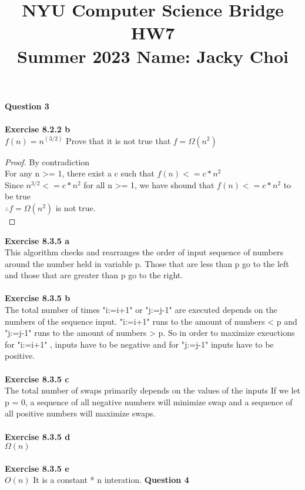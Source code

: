 \documentclass{article}
\title{\textbf{NYU Computer Science Bridge HW7}\\
Summer 2023 Name: Jacky Choi}
\date{}
\begin{document}
\setul{}{2pt}
\maketitle

\noindent \textbf{Question 3}\\\\
\textbf{Exercise 8.2.2 b}\\
$f(n) = n^{(3/2)}$ Prove that it is not true that $f = \Omega(n^2)$\\
\begin{proof}
    By contradiction\\
    For any n >= 1, there exist a c such that $f(n) <= c * n^2$\\
    Since $n^{3/2} <= c * n^2$ for all n >= 1, we have shound that $f(n) <= c * n^2$ to be true\\
    $\therefore f = \Omega(n^2)$ is not true.\\
\end{proof}
\noindent\textbf{Exercise 8.3.5 a}\\
This algorithm checks and rearranges the order of input sequence of numbers around the number held in variable p. Those that are less than p go to the left and those that are greater than p go to the right. \\\\
\textbf{Exercise 8.3.5 b}\\
The total number of times "i:=i+1" or "j:=j-1" are executed depends on the numbers of the sequence input. "i:=i+1" runs to the amount of numbers < p and "j:=j-1" runs to the amount of numbers > p. So in order to maximize exeuctions for "i:=i+1" , inputs have to be negative and for "j:=j-1" inputs have to be positive.\\\\
\textbf{Exercise 8.3.5 c}\\
The total number of swaps primarily depends on the values of the inputs  If we let p = 0, a sequence of all negative numbers will minimize swap and a sequence of all positive numbers will maximize swaps.\\\\
\textbf{Exercise 8.3.5 d}\\
$\Omega(n)$\\\\
\textbf{Exercise 8.3.5 e}\\
$O(n)$ It is a constant * n interation.
\newpage
\noindent \textbf{Question 4}\\\\
\end{document}
